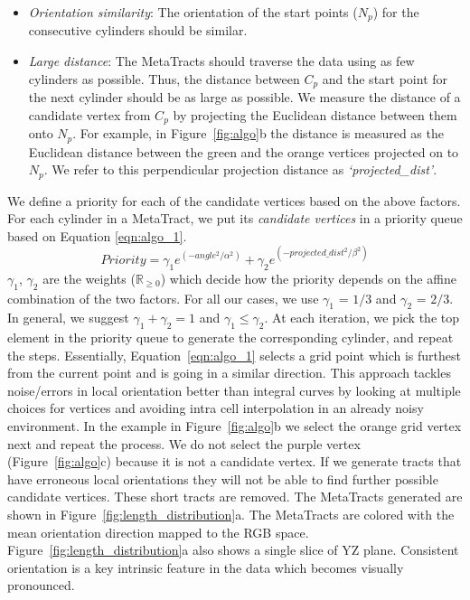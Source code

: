 \begin{itemize}[noitemsep]
\item \textit{Orientation similarity}: The orientation of the start points ($N_p$) for the consecutive cylinders should be similar. 
\item \textit{Large distance}: The MetaTracts should traverse the data using as few cylinders as possible. Thus, the distance between $C_p$ and the start point for the next cylinder should be as large as possible. We measure the distance of a candidate vertex from $C_p$ by projecting the Euclidean distance between them onto $N_p$. For example, in Figure~\ref{fig:algo}b the distance is measured as the Euclidean distance between the green and the orange vertices projected on to $N_p$. We refer to this perpendicular projection distance as \textit{`projected\_dist'}. 

\end{itemize}
We define a priority for each of the candidate vertices based on the above factors.
For each cylinder in a MetaTract, we put its \textit{candidate vertices} in a priority queue based on Equation \ref{eqn:algo_1}.
\begin{equation}
Priority = \gamma_1 e^{(-angle^2 / \alpha^2)} + \gamma_2e^{(-projected\_dist^2 / \beta^2)}
\label{eqn:algo_1}
\end{equation}
$\gamma_1$, $\gamma_2$ are the  weights ($\mathbb{R}_{\ge 0}$)  which decide how the priority depends on the affine combination of the two factors. For all our cases, we use $\gamma_1$ = $1 / 3 $ and $\gamma_2$ = $2 / 3$. In general, we suggest $\gamma_1 +\gamma_2 = 1 $ and $\gamma_1 \leq \gamma_2$. At each iteration, we pick the top element in the priority queue to generate the corresponding cylinder, and repeat the steps. Essentially, Equation~\ref{eqn:algo_1} selects a grid point which is furthest from the current point and is going in a similar direction. This approach tackles noise/errors in local orientation better than integral curves by looking at multiple choices for vertices and avoiding intra cell interpolation in an already noisy environment. 
% 
In the example in Figure~\ref{fig:algo}b we select the orange grid vertex next and repeat the process. We do not select the purple vertex (Figure~\ref{fig:algo}c) because it is not a candidate vertex. If we generate tracts that have erroneous local orientations they will not be able to find further possible candidate vertices. These short tracts are removed. The MetaTracts generated are shown in Figure~\ref{fig:length_distribution}a. The MetaTracts are colored with the mean orientation direction mapped to the RGB space. Figure~\ref{fig:length_distribution}a also shows a single slice of YZ plane. Consistent orientation is a key intrinsic feature in the data which becomes visually pronounced.
